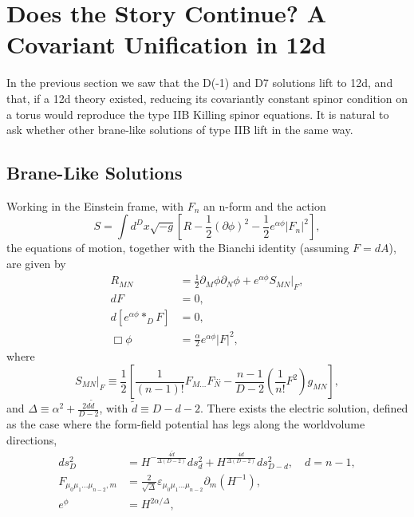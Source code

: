 \section{Does the Story Continue? A Covariant Unification in 12d}
\label{sec:covariant-unification}

In the previous section we saw that the D(-1) and D7 solutions lift to 12d, and that, if a 12d theory existed, reducing its covariantly constant spinor condition on a torus would reproduce the type IIB Killing spinor equations.
It is natural to ask whether other brane-like solutions of type IIB lift in the same way.


\subsection{Brane-Like Solutions}
\label{sec:general brane solns}
Working in the Einstein frame, with $F_n$ an n-form and the action
\begin{equation}
S = \int d^Dx\sqrt{-g}\left[
    R - \frac{1}{2}(\partial\phi)^2 - \frac{1}{2}e^{\alpha\phi}|F_n|^2
\right],
\end{equation}
the equations of motion, together with the Bianchi identity (assuming $F = dA$), are given by \cite{Stelle:1998xg}
\begin{equation}
\begin{aligned}
R_{MN}
&= \frac{1}{2}\partial_M\phi\partial_N\phi + e^{\alpha\phi}S_{MN}\big|_F,\\
dF&=0,\\
d[e^{\alpha\phi}*_D F] &=0,\\
\Box\phi&=\frac{\alpha}{2}e^{\alpha\phi}|F|^2,
\end{aligned}
\end{equation}
where
\begin{equation}
S_{MN}\big|_{F}\equiv
\frac{1}{2}\left[
    \frac{1}{(n-1)!}F_{M...}F_N^{...}
    -\frac{n-1}{D-2}\left(\frac{1}{n!}F^2\right)g_{MN}
\right],
\end{equation}
and $\Delta\equiv \alpha^2 +\frac{2 d \tilde{d}}{D-2}$, with $\tilde{d} \equiv D-d-2$.
There exists the electric solution, defined as the case where the form-field potential has legs along the worldvolume directions,
\begin{equation}
\begin{aligned}
ds_D^2
&=H^{-\frac{4\tilde d}{\Delta(D-2)}}ds_{d}^2+
H^{\frac{4d}{\Delta(D-2)}}ds_{D-d}^2,\quad
d = n-1,\\
F_{\mu_0\mu_1...\mu_{n-2},m}
&=\frac{2}{\sqrt\Delta}\varepsilon_{\mu_0\mu_1...\mu_{n-2}}\partial_m (H^{-1}),\\
e^\phi
&=H^{2\alpha/\Delta},
\end{aligned}
\end{equation}
